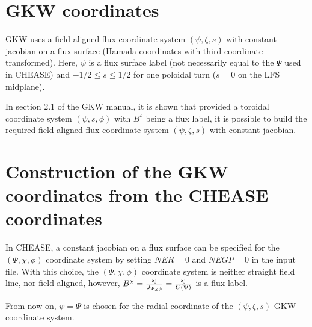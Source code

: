 \documentclass[a4paper,12pt]{article}
\newcommand{\ind}[1]{\ensuremath{_{\rm{#1}}}}
\begin{document}
\section{GKW coordinates}
GKW uses a field aligned flux coordinate system $\left(\psi,\zeta,s\right)$ with constant jacobian on a flux surface (Hamada coordinates with third coordinate transformed). Here, $\psi$ is a flux surface label (not necessarily equal to the $\Psi$ used in CHEASE) and $-1/2\leq s\leq1/2$ for one poloidal turn ($s=0$ on the LFS midplane).

In section 2.1 of the GKW manual, it is shown that provided a toroidal coordinate system $\left(\psi,s,\phi\right)$ with $B^s$ being a flux label, it is possible to build the required field aligned flux coordinate system $\left(\psi,\zeta,s\right)$ with constant jacobian.

\section{Construction of the GKW coordinates from the CHEASE coordinates}
In CHEASE, a constant jacobian on a flux surface can be specified for the $\left(\Psi,\chi,\phi\right)$ coordinate system by setting $NER=0$ and $NEGP=0$ in the input file. With this choice, the
$\left(\Psi,\chi,\phi\right)$ coordinate system is neither straight field line, nor field aligned, however, $B^\chi=\frac{s\ind{j}}{J_{\Psi\chi\phi}}=\frac{s\ind{j}}{C(\Psi)}$ is a flux label.

From now on, $\psi=\Psi$ is chosen for the radial coordinate of the $\left(\psi,\zeta,s\right)$ GKW coordinate system.
\end{document}
